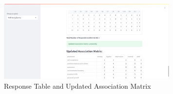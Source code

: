 \begin{figure}[h!]  
    \centering
    \includegraphics[width=0.8\textwidth]{App Images/31 Interface.png}  
    \caption{Response Table and Updated Association Matrix}
    \label{10i23445}  %
\end{figure} 

